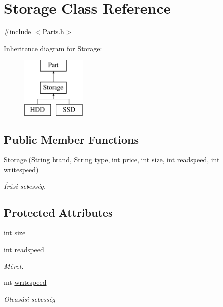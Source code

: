 \hypertarget{class_storage}{}\section{Storage Class Reference}
\label{class_storage}


{\ttfamily \#include $<$Parts.\+h$>$}

Inheritance diagram for Storage\+:\begin{figure}[H]
\begin{center}
\leavevmode
\includegraphics[height=3.000000cm]{class_storage}
\end{center}
\end{figure}
\subsection*{Public Member Functions}
\begin{DoxyCompactItemize}
\item 
\mbox{\hyperlink{class_storage_a502a2ec76e09d48a87da6ed1b91cdaa8}{Storage}} (\mbox{\hyperlink{class_string}{String}} \mbox{\hyperlink{class_part_ae06f2fdeb7fbbdb229a7aca151f3e341}{brand}}, \mbox{\hyperlink{class_string}{String}} \mbox{\hyperlink{class_part_a101dbcc5c4b21564df7414c7eb0eae88}{type}}, int \mbox{\hyperlink{class_part_a8e71223aed1da95a974f33d8d6c91bb1}{price}}, int \mbox{\hyperlink{class_storage_abcc80ce58a21fa884035617ee0b6cb67}{size}}, int \mbox{\hyperlink{class_storage_a41073842ff16961dad3903e6dd49bb0c}{readspeed}}, int \mbox{\hyperlink{class_storage_a0198a1483ccf849d48c76da88599ba8b}{writespeed}})
\begin{DoxyCompactList}\small\item\em Írási sebesség. \end{DoxyCompactList}\end{DoxyCompactItemize}
\subsection*{Protected Attributes}
\begin{DoxyCompactItemize}
\item 
int \mbox{\hyperlink{class_storage_abcc80ce58a21fa884035617ee0b6cb67}{size}}
\item 
int \mbox{\hyperlink{class_storage_a41073842ff16961dad3903e6dd49bb0c}{readspeed}}
\begin{DoxyCompactList}\small\item\em Méret. \end{DoxyCompactList}\item 
int \mbox{\hyperlink{class_storage_a0198a1483ccf849d48c76da88599ba8b}{writespeed}}
\begin{DoxyCompactList}\small\item\em Olvasási sebesség. \end{DoxyCompactList}\end{DoxyCompactItemize}


